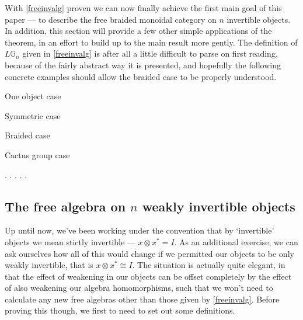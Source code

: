 With \cref{freeinvalg} proven we can now finally achieve the first main goal of this paper --- to describe the free braided monoidal category on $n$ invertible objects. In addition, this section will provide a few other simple applications of the theorem, in an effort to build up to the main result more gently. The definition of $L\mathbb{G}_n$ given in \ref{freeinvalg} is after all a little difficult to parse on first reading, because of the fairly abstract way it is presented, and hopefully the following concrete examples should allow the braided case to be properly understood.

\begin{prop} One object case
\end{prop}

\begin{prop} Symmetric case
\end{prop}

\begin{prop} Braided case
\end{prop}

\begin{prop} Cactus group case
\end{prop}

.
.
.
.
.


\subsection{The free algebra on $n$ weakly invertible objects}

Up until now, we've been working under the convention that by `invertible' objects we mean stictly invertible --- $x \otimes x^* = I$. As an additional exercise, we can ask ourselves how all of this would change if we permitted our objects to be only weakly invertible, that is $x \otimes x^* \cong I$. The situation is actually quite elegant, in that the effect of weakening in our objects can be offset completely by the effect of also weakening our algebra homomorphisms, such that we won't need to calculate any new free algebras other than those given by \cref{freeinvalg}. Before proving this though, we first to need to set out some definitions.

